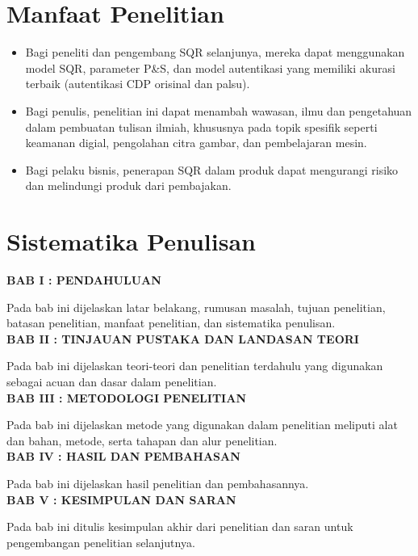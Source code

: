 \section{Manfaat Penelitian}
\begin{itemize}
      \item Bagi peneliti dan pengembang SQR selanjunya, mereka dapat menggunakan model SQR, parameter P\&S, dan model autentikasi yang memiliki akurasi terbaik
            (autentikasi CDP orisinal dan palsu).
      \item Bagi penulis, penelitian ini dapat menambah wawasan, ilmu dan pengetahuan dalam pembuatan tulisan ilmiah, khususnya pada topik spesifik seperti keamanan
            digial, pengolahan citra gambar, dan pembelajaran mesin.
      \item Bagi pelaku bisnis, penerapan SQR dalam produk dapat mengurangi risiko dan melindungi produk dari pembajakan.
\end{itemize}

\section{Sistematika Penulisan}
\noindent
\textbf{BAB I : PENDAHULUAN}

\noindent Pada bab ini dijelaskan latar belakang, rumusan masalah, tujuan penelitian, batasan penelitian, manfaat penelitian, dan sistematika penulisan.\\

\noindent
\textbf{BAB II : TINJAUAN PUSTAKA DAN LANDASAN TEORI}

\noindent Pada bab ini dijelaskan teori-teori dan penelitian terdahulu yang digunakan sebagai acuan dan dasar dalam penelitian.\\

\noindent
\textbf{BAB III : METODOLOGI PENELITIAN}

\noindent Pada bab ini dijelaskan metode yang digunakan dalam penelitian meliputi alat dan bahan, metode, serta tahapan dan alur penelitian.\\

\noindent
\textbf{BAB IV : HASIL DAN PEMBAHASAN}

\noindent Pada bab ini dijelaskan hasil penelitian dan pembahasannya.\\

\noindent
\textbf{BAB V : KESIMPULAN DAN SARAN}

\noindent Pada bab ini ditulis kesimpulan akhir dari penelitian dan saran untuk pengembangan penelitian selanjutnya.\\